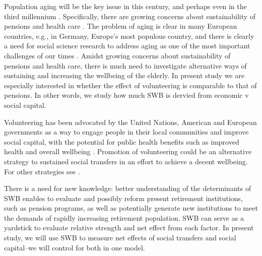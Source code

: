 \documentclass[10pt, letterpaper]{article}
\newcommand{\emd}[1]{\ExecuteMetaData[/tmp/tex]{#1}} %
\begin{document}
\begin{spacing}{1.4} %




Population aging will be the key issue in this century, and perhaps even in 
the third
millennium  \citep{stolnitz1992demographic}. Specifically, there are growing
concerns about sustainability of pensions and health care \citep{jurges12}. 
The problem of aging is clear in many European countries, e.g., in
Germany, Europe's most populous country, and there is clearly a need for social
science research to address aging as one of the most important challenges of our
times \citep{vaupel2006redistributing}. 
%
Amidst growing concerns about sustainability of pensions and health care, there
is much need to investigate alternative ways  of sustaining and increasing  the wellbeing of
the elderly. %
 In present study %
we are especially interested in whether the effect of volunteering is comparable
to that of pensions. In other words, we
study how much SWB is dervied from economic v social capital. 

Volunteering has been advocated by the United Nations, American and European
governments as a way to engage people in their local communities and improve
social capital, with the potential for public health benefits such as improved 
health and overall wellbeing 
\citep{jenkinson2013volunteering}. Promotion of volunteering could be an
alternative 
strategy to sustained social transfers in an effort to achieve a decent
wellbeing.  For other strategies see \citet[][sec. 2.4.5]{ferring10}. 

There is a need for new knowledge: better understanding of the determinants of
SWB enables to evaluate and possibly reform present retirement
institutions, such as pension programs, as well
as potentially generate new institutions to meet the demands of rapidly
increasing retirement population. SWB can serve as a yardstick to evaluate
relative strength and net effect from each factor. In present study, we will use SWB
to measure net effects of social transfers and social capital--we will control
for both in one model.


\end{spacing}
\end{document}
